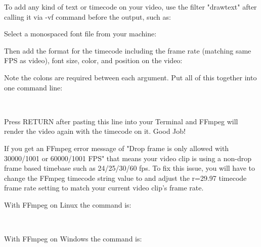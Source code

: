\begin{fullwidth}

To add any kind of text or timecode on your video, use the filter "drawtext" after calling it via -vf command before the output, such as:


Select a monospaced font file from your machine:


Then add the format for the timecode including the frame rate (matching same FPS as video), font size, color, and position on the video:


Note the colons are required between each argument. Put all of this together into one command line:

\\

Press RETURN after pasting this line into your Terminal and FFmpeg will render the video again with the timecode on it. Good Job!

If you get an FFmpeg error message of "Drop frame is only allowed with 30000/1001 or 60000/1001 FPS" that means your video clip is using a non-drop frame based timebase such as 24/25/30/60 fps. To fix this issue, you will have to change the FFmpeg timecode string value to  and adjust the r=29.97 timecode frame rate setting to match your current video clip's frame rate.

With FFmpeg on Linux the command is:

\\

With FFmpeg on Windows the command is: 


\end{fullwidth}
